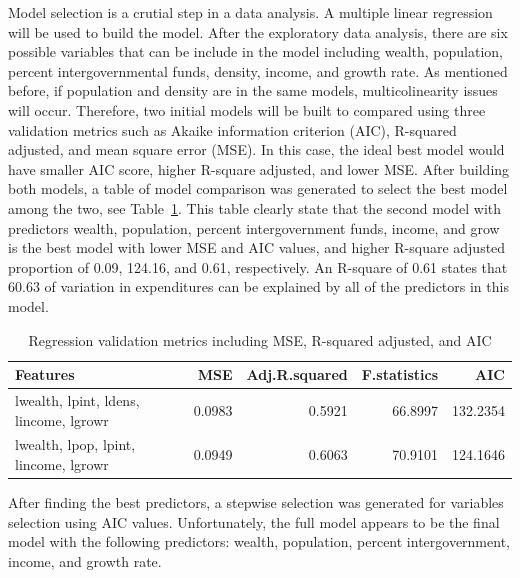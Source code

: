 \documentclass[11pt]{article}\usepackage[]{graphicx}\usepackage[]{color}
\begin{document}
\noindent Model selection is a crutial step in a data analysis. A multiple linear regression will be used to build the model. After the exploratory data analysis, there are six possible variables that can be include in the model including wealth, population, percent intergovernmental funds, density, income, and growth rate. As mentioned before, if population and density are in the same models, multicolinearity issues will occur. Therefore, two initial models will be built to compared using three validation metrics such as Akaike information criterion (AIC), R-squared adjusted, and mean square error (MSE). In this case, the ideal best model would have smaller AIC score, higher R-square adjusted, and lower MSE. After building both models, a table of model comparison was generated to select the best model among the two, see Table~\ref{reg_vali_metric}. This table clearly state that the second model with predictors wealth, population, percent intergovernment funds, income, and grow is the best model with lower MSE and AIC values, and higher R-square adjusted proportion of 0.09, 124.16, and 0.61, respectively. An R-square of 0.61 states that 60.63 of variation in expenditures can be explained by all of the predictors in this model.        
\begin{center}
\begin{table}[ht]
\centering
\begin{tabular}{lrrrr}
  \hline
Features & MSE & Adj.R.squared & F.statistics & AIC \\ 
  \hline
lwealth, lpint, ldens, lincome, lgrowr & 0.0983 & 0.5921 & 66.8997 & 132.2354 \\ 
  lwealth, lpop, lpint, lincome, lgrowr & 0.0949 & 0.6063 & 70.9101 & 124.1646 \\ 
   \hline
\end{tabular}
\caption{Regression validation metrics including MSE, R-squared adjusted, and AIC} 
\label{reg_vali_metric}
\end{table}

\end{center} 

\noindent After finding the best predictors, a stepwise selection was generated for variables selection using AIC values. Unfortunately, the full model appears to be the final model with the following predictors: wealth, population, percent intergovernment, income, and growth rate.  


\hfill \break
\end{document}
